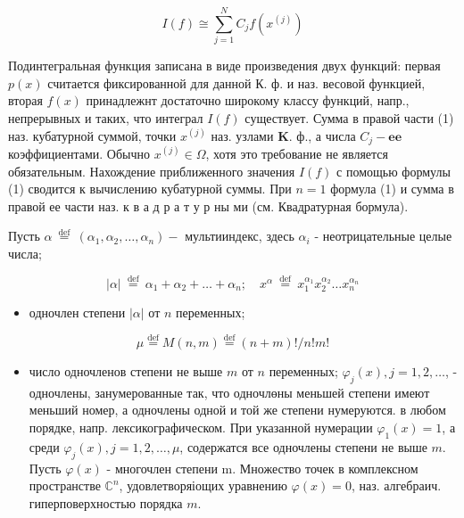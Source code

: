 \documentclass[10pt]{article}
\begin{document}
\[

I(f) \cong \sum_{j=1}^{N} C_{j} f\left(x^{(j)}\right)

\]



Подинтегральная функция записана в виде произведения двух функций: первая $p(x)$ считается фиксированной для данной $К$. ф. и наз. весовой функцией, вторая $f(x)$ принадлежнт достаточно широкому классу функций, напр., непрерывных и таких, что интеграл $I(f)$ существует. Сумма в правой части (1) наз. кубатурной суммой, точки $x^{(j)}$ наз. узлами $\mathbf{K}$. ф., а числа $C_{j}-\mathbf{e e}$ коэффициентами. Обычно $x^{(j)} \in \Omega$, хотя это требование не является обязательным. Нахождение приближенного значения $I(f)$ с помощью формулы (1) сводится к вычислению кубатурной суммы. При $n=1$ формула (1) и сумма в правой ее части наз. к в а д р а т у р ны ми (см. Квадратурная бормула).



Пусть $\alpha \stackrel{\text { def }}{=}\left(\alpha_{1}, \alpha_{2}, \ldots, \alpha_{n}\right)-$ мультииндекс, здесь $\alpha_{i}$ - неотрицательные целые числа;



\[

|\alpha| \stackrel{\text { def }}{=} \alpha_{1}+\alpha_{2}+\ldots+\alpha_{n} ; \quad x^{\alpha} \stackrel{\text { def }}{=} x_{1}^{\alpha_{1}} x_{2}^{\alpha_{2}} \ldots x_{n}^{\alpha_{n}}

\]



\begin{itemize}

  \item одночлен степени $|\alpha|$ от $n$ переменных;

\end{itemize}



\[

\mu \stackrel{\operatorname{def}}{=} M(n, m) \stackrel{\operatorname{def}}{=}(n+m) ! / n ! m !

\]



\begin{itemize}

  \item число одночленов степени не выше $m$ от $n$ переменных; $\varphi_{j}(x), j=1,2, \ldots$, - одночлены, занумерованные так, что одночлөны меньшей степени имеют меньший номер, а одночлены одной и той же степени нумеруются. в любом порядке, напр. лексикографическом. При указанной нумерации $\varphi_{1}(x)=1$, а среди $\varphi_{j}(x), j=1,2, \ldots, \mu$, содержатся все одночлены степени не выше $m$. Пусть $\varphi(x)$ - многочлен степени m. Множество точек в комплексном пространстве $\mathbb{C}^{n}$, удовлетворяіощих уравнению $\varphi(x)=0$, наз. алгебраич. гиперповерхностью порядка $m$.

\end{itemize}
\end{document}
